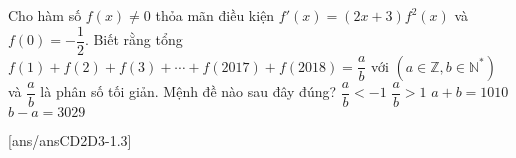 \begin{ex}%
	Cho hàm số $f(x)\neq 0$ thỏa mãn điều kiện $f'(x)=(2x+3)f^2(x)$ và $f(0)=-\dfrac{1}{2}$. Biết rằng tổng $f(1)+f(2)+f(3)+\cdots +f(2017)+f(2018)=\dfrac{a}{b}$ với $\left(a\in\mathbb{Z}, b\in{\mathbb{N}}^*\right)$ và $\dfrac{a}{b}$ là phân số tối giản. Mệnh đề nào sau đây đúng?
	\choice
	{$\dfrac{a}{b} <-1$}
	{$\dfrac{a}{b}>1$}
	{$a+b=1010$}
	{\True $b-a=3029$}
\end{ex}
[ans/ansCD2D3-1.3]
